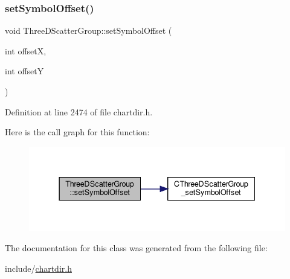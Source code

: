 \subsubsection{\texorpdfstring{set\+Symbol\+Offset()}{setSymbolOffset()}}
{\footnotesize\ttfamily void Three\+D\+Scatter\+Group\+::set\+Symbol\+Offset (\begin{DoxyParamCaption}\item[{int}]{offsetX,  }\item[{int}]{offsetY }\end{DoxyParamCaption})\hspace{0.3cm}{\ttfamily [inline]}}



Definition at line 2474 of file chartdir.\+h.

Here is the call graph for this function\+:
\nopagebreak
\begin{figure}[H]
\begin{center}
\leavevmode
\includegraphics[width=337pt]{class_three_d_scatter_group_a55fc5e93a7eed2319f694140c505cf2d_cgraph}
\end{center}
\end{figure}


The documentation for this class was generated from the following file\+:\begin{DoxyCompactItemize}
\item 
include/\hyperlink{chartdir_8h}{chartdir.\+h}\end{DoxyCompactItemize}
